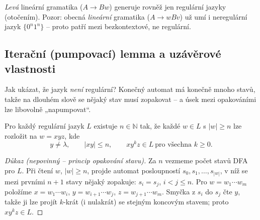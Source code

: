 \documentclass[11pt,a4paper]{article}
\begin{document}
\begin{poznamka}
\emph{Levá} lineární gramatika ($A\to Bw$) generuje rovněž jen regulární jazyky (otočením). Pozor: obecná \emph{lineární} gramatika ($A\to wBv$) už umí i neregulární jazyk $\{0^n1^n\}$ -- proto patří mezi bezkontextové, ne regulární.
\end{poznamka}

\subsection{Iterační (pumpovací) lemma a uzávěrové vlastnosti}

Jak ukázat, že jazyk \emph{není} regulární? Konečný automat má konečně mnoho stavů, takže na dlouhém slově se nějaký stav musí zopakovat -- a úsek mezi opakováními lze libovolně „napumpovat``.

\begin{veta}
Pro každý regulární jazyk $L$ existuje $n\in\mathbb N$ tak, že každé $w\in L$ s $|w|\ge n$ lze rozložit na $w=xyz$, kde
\[ y\neq\lambda,\qquad |xy|\le n,\qquad xy^kz\in L\ \text{pro všechna } k\ge 0. \]
\end{veta}

\begin{proof}[Důkaz \textnormal{(nepovinný -- princip opakování stavu)}]
Za $n$ vezmeme počet stavů DFA pro $L$. Při čtení $w$, $|w|\ge n$, projde automat posloupností $s_0,s_1,\dots,s_{|w|}$, v níž se mezi prvními $n+1$ stavy nějaký zopakuje: $s_i=s_j$, $i<j\le n$. Pro $w=w_1\cdots w_m$ položíme $x=w_1\cdots w_i$, $y=w_{i+1}\cdots w_j$, $z=w_{j+1}\cdots w_m$. Smyčka z $s_i$ do $s_j$ čte $y$, takže ji lze projít $k$-krát (i nulakrát) se stejným koncovým stavem; proto $xy^kz\in L$.
\end{proof}

\begin{center}
\end{center}
\end{document}
